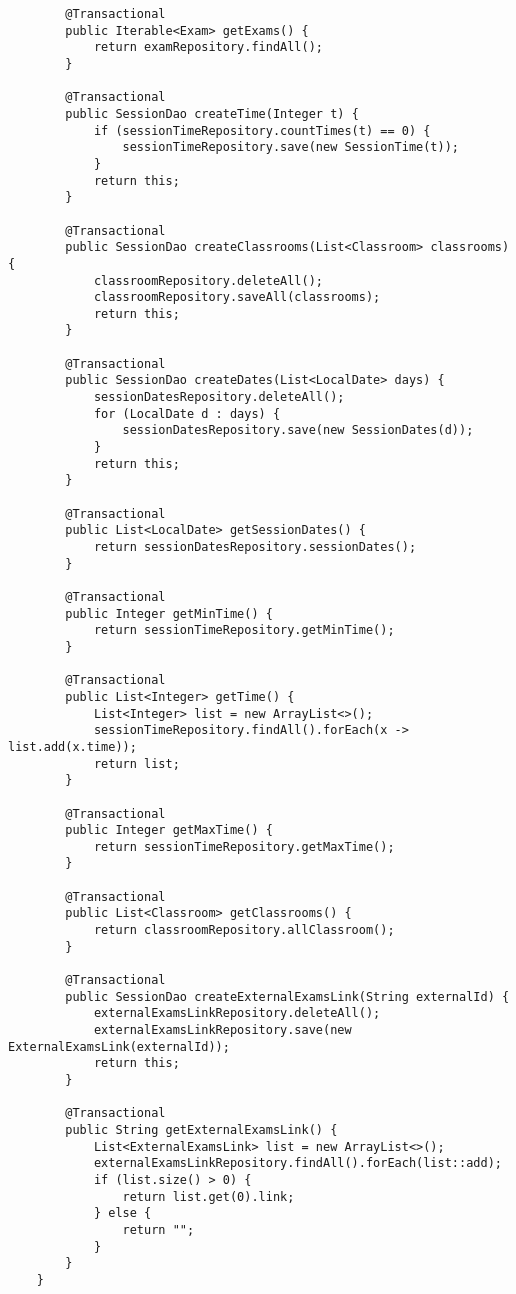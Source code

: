 \begin{lstlisting}
		@Transactional
		public Iterable<Exam> getExams() {
			return examRepository.findAll();
		}
		
		@Transactional
		public SessionDao createTime(Integer t) {
			if (sessionTimeRepository.countTimes(t) == 0) {
				sessionTimeRepository.save(new SessionTime(t));
			}
			return this;
		}
		
		@Transactional
		public SessionDao createClassrooms(List<Classroom> classrooms) {
			classroomRepository.deleteAll();
			classroomRepository.saveAll(classrooms);
			return this;
		}
		
		@Transactional
		public SessionDao createDates(List<LocalDate> days) {
			sessionDatesRepository.deleteAll();
			for (LocalDate d : days) {
				sessionDatesRepository.save(new SessionDates(d));
			}
			return this;
		}
		
		@Transactional
		public List<LocalDate> getSessionDates() {
			return sessionDatesRepository.sessionDates();
		}
		
		@Transactional
		public Integer getMinTime() {
			return sessionTimeRepository.getMinTime();
		}
		
		@Transactional
		public List<Integer> getTime() {
			List<Integer> list = new ArrayList<>();
			sessionTimeRepository.findAll().forEach(x -> list.add(x.time));
			return list;
		}
		
		@Transactional
		public Integer getMaxTime() {
			return sessionTimeRepository.getMaxTime();
		}
		
		@Transactional
		public List<Classroom> getClassrooms() {
			return classroomRepository.allClassroom();
		}
		
		@Transactional
		public SessionDao createExternalExamsLink(String externalId) {
			externalExamsLinkRepository.deleteAll();
			externalExamsLinkRepository.save(new ExternalExamsLink(externalId));
			return this;
		}
		
		@Transactional
		public String getExternalExamsLink() {
			List<ExternalExamsLink> list = new ArrayList<>();
			externalExamsLinkRepository.findAll().forEach(list::add);
			if (list.size() > 0) {
				return list.get(0).link;
			} else {
				return "";
			}
		}
	}
	
	
\end{lstlisting}